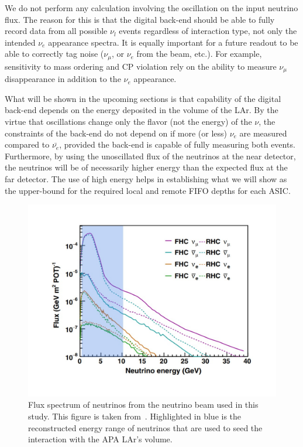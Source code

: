 We do not perform any calculation involving the oscillation on the input neutrino flux.
The reason for this is that the digital back-end should be able to fully record data from all possible $\nu_{l}$ events regardless of interaction type, not only the intended $\nu_{e}$ appearance spectra.
It is equally important for a future readout to be able to correctly tag noise ($\nu_{\mu}$, or $\nu_{e}$ from the beam, etc.).
For example, sensitivity to mass ordering and CP violation rely on the ability to measure $\nu_{\mu}$ disappearance in addition to the $\nu_{e}$ appearance.

What will be shown in the upcoming sections is that capability of the digital back-end depends on the energy deposited in the volume of the LAr.
By the virtue that oscillations change only the flavor (not the energy) of the $\nu$, the constraints of the back-end do not depend on if more (or less) $\nu_{e}$ are measured compared to $\bar{\nu_{e}}$, provided the back-end is capable of fully measuring both events.
Furthermore, by using the unoscillated flux of the neutrinos at the near detector, the neutrinos will be of necessarily higher energy than the expected flux at the far detector.
The use of high energy helps in establishing what we will show as the upper-bound for the required local and remote FIFO depths for each ASIC.

\begin{figure}[]
\centering
\includegraphics[width=\textwidth]{images/dune_flux_energy_range.pdf}
\caption{Flux spectrum of neutrinos from the neutrino beam used in this study. This figure is taken from~\cite{electron_flux_image_2020}. 
Highlighted in blue is the reconstructed energy range of neutrinos that are used to seed the interaction with the APA LAr's volume.}
\end{figure}~\label{fig:neutrino_flux}

